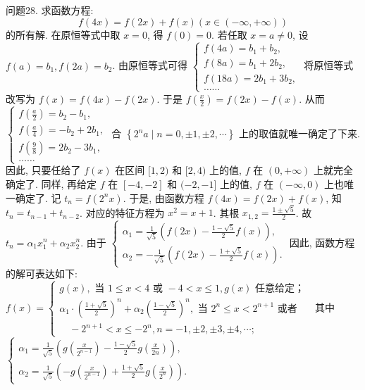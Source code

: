 问题28. 求函数方程:
$$
f(4 x)=f(2 x)+f(x)(x \in(-\infty,+\infty))
$$
的所有解.
在原恒等式中取 $x=0$, 得 $f(0)=0$. 若任取 $x=a \neq 0$, 设 $f(a)=b_1, f(2 a)=b_2$. 
由原恒等式可得 $\left\{\begin{array}{l}f(4 a)=b_1+b_2, \\ f(8 a)=b_1+2 b_2, \\ f(18 a)=2 b_1+3 b_2, \\ \ldots \ldots\end{array}\right.$ 
将原恒等式改写为 $f(x)=f(4 x)-f(2 x)$. 于是 $f\left(\frac{x}{2}\right)=f(2 x)-f(x)$. 从而 $\left\{\begin{array}{l}f\left(\frac{a}{2}\right)=b_2-b_1, \\ f\left(\frac{a}{4}\right)=-b_2+2 b_1, \\ f\left(\frac{9}{8}\right)=2 b_2-3 b_1, \\ \ldots \ldots\end{array}\right.$ 合 $\left\{2^n a \mid n=0, \pm 1, \pm 2, \cdots\right\}$ 上的取值就唯一确定了下来.
因此, 只要任给了 $f(x)$ 在区间 $[1,2)$ 和 $[2,4)$ 上的值, $f$ 在 $(0,+\infty)$ 上就完全确定了.
同样, 再给定 $f$ 在 $[-4,-2]$ 和 $(-2,-1]$ 上的值, $f$ 在 $(-\infty, 0)$ 上也唯一确定了.
记 $t_n=f\left(2^n x\right)$. 
于是, 由函数方程 $f(4 x)=f(2 x)+f(x)$, 知 $t_n=t_{n-1}+t_{n-2}$. 对应的特征方程为 $x^2=x+1$. 其根 $x_{1,2}=\frac{1 \pm \sqrt{5}}{2}$. 故 $t_n=\alpha_1 x_1^n+\alpha_2 x_2^n$. 由于 $\left\{\begin{array}{l}\alpha_1=\frac{1}{\sqrt{5}}\left(f(2 x)-\frac{1-\sqrt{5}}{2} f(x)\right), \\ \alpha_2=-\frac{1}{\sqrt{5}}\left(f(2 x)-\frac{1+\sqrt{5}}{2} f(x)\right) .\end{array}\right.$
因此, 函数方程的解可表达如下: $f(x)=\left\{\begin{aligned} g(x), \text { 当 } 1 \leqslant x<4 \text { 或 }-4<x \leqslant 1, g(x) \text { 任意给定； } \\ \alpha_1 \cdot\left(\frac{1+\sqrt{5}}{2}\right)^n+\alpha_2\left(\frac{1-\sqrt{5}}{2}\right)^n, \text { 当 } 2^n \leqslant x<2^{n+1} \text { 或者 } \\ \quad-2^{n+1}<x \leqslant-2^n, n=-1, \pm 2, \pm 3, \pm 4, \cdots ;\end{aligned}\right.$ 其中 $\left\{\begin{array}{l}\alpha_1=\frac{1}{\sqrt{5}}\left(g\left(\frac{x}{2^{n-1}}\right)-\frac{1-\sqrt{5}}{2} g\left(\frac{x}{2 n}\right)\right), \\ \alpha_2=\frac{1}{\sqrt{5}}\left(-g\left(\frac{x}{2^{n-1}}\right)+\frac{1+\sqrt{5}}{2} g\left(\frac{x}{2^n}\right)\right) .\end{array}\right.$




